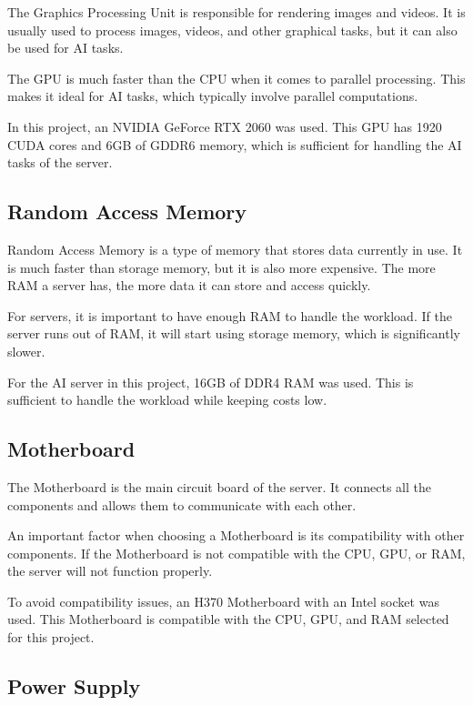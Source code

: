 The Graphics Processing Unit is responsible for rendering images and videos. It is usually used to process images, videos, and other graphical tasks, but it can also be used for AI tasks.

The GPU is much faster than the CPU when it comes to parallel processing. This makes it ideal for AI tasks, which typically involve parallel computations.

In this project, an NVIDIA GeForce RTX 2060 was used. This GPU has 1920 CUDA cores and 6GB of GDDR6 memory, which is sufficient for handling the AI tasks of the server.

\cite{GPUwiki}
\cite{GF2060}

\subsection{Random Access Memory}

Random Access Memory is a type of memory that stores data currently in use. It is much faster than storage memory, but it is also more expensive. The more RAM a server has, the more data it can store and access quickly.

For servers, it is important to have enough RAM to handle the workload. If the server runs out of RAM, it will start using storage memory, which is significantly slower.

For the AI server in this project, 16GB of DDR4 RAM was used. This is sufficient to handle the workload while keeping costs low.

\cite{RAMwiki}

\subsection{Motherboard}

The Motherboard is the main circuit board of the server. It connects all the components and allows them to communicate with each other.

An important factor when choosing a Motherboard is its compatibility with other components. If the Motherboard is not compatible with the CPU, GPU, or RAM, the server will not function properly.

To avoid compatibility issues, an H370 Motherboard with an Intel socket was used. This Motherboard is compatible with the CPU, GPU, and RAM selected for this project.

\cite{Motherboard}

\subsection{Power Supply}

